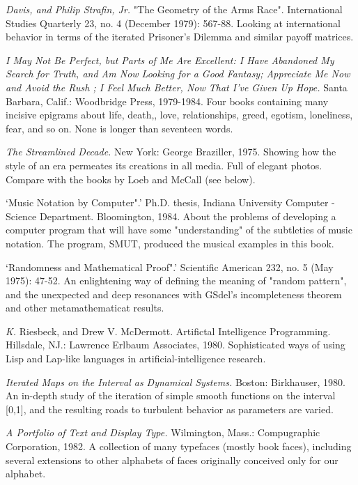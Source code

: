  {\sl Davis, and Philip Strafin, Jr.} "The Geometry of the Arms Race". International Studies Quarterly 23, no. 4 (December 1979): 567-88. Looking at international behavior in terms of the iterated Prisoner's Dilemma and similar payoff matrices.

 {\sl I May Not Be Perfect, but Parts of Me Are Excellent: I Have Abandoned My Search for Truth, and Am Now Looking for a Good Fantasy; Appreciate Me Now and Avoid the Rush ; I Feel Much Better, Now That I've Given Up Hope.} Santa Barbara, Calif.: Woodbridge Press, 1979-1984. Four books containing many incisive epigrams about life, death,, love, relationships, greed, egotism, loneliness, fear, and so on. None is longer than seventeen words.

 {\sl The Streamlined Decade.} New York: George Braziller, 1975. Showing how the style of an era permeates its creations in all media. Full of elegant photos. Compare with the books by Loeb and McCall (see below).

 `Music Notation by Computer".' Ph.D. thesis, Indiana University Computer - Science Department. Bloomington, 1984. About the problems of developing a computer program that will have some "understanding" of the subtleties of music notation. The program, SMUT, produced the musical examples in this book.

 `Randomness and Mathematical Proof".' Scientific American 232, no. 5 (May 1975): 47-52. An enlightening way of defining the meaning of "random pattern", and the unexpected and deep resonances with GSdel's incompleteness theorem and other metamathematicat results.

 {\sl K.} Riesbeck, and Drew V. McDermott. Artifictal Intelligence Programming. Hillsdale, NJ.: Lawrence Erlbaum Associates, 1980. Sophisticated ways of using Lisp and Lap-like languages in artificial-intelligence research.

 {\sl Iterated Maps on the Interval as Dynamical Systems.} Boston: Birkhauser, 1980. An in-depth study of the iteration of simple smooth functions on the interval [0,1], and the resulting roads to turbulent behavior as parameters are varied.

 {\sl A Portfolio of Text and Display Type.} Wilmington, Mass.: Compugraphic Corporation, 1982. A collection of many typefaces (mostly book faces), including several extensions to other alphabets of faces originally conceived only for our alphabet.


